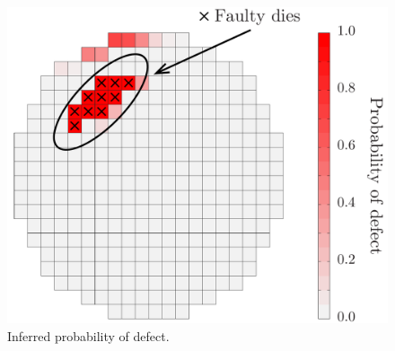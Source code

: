 \begin{figure}[t!]
  \centering
  \includegraphics[width=0.6\linewidth]{include/figures/wafer-defect.pdf}
  \caption{Inferred probability of defect.}
  \vspace{-1.5em}
\end{figure}
